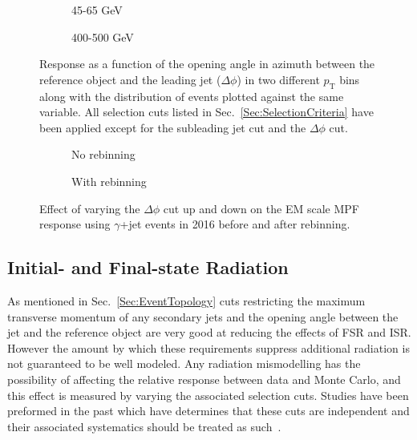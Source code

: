 \begin{figure}[!ht]
\centering
\begin{subfigure}{.5\textwidth}
\centering
{}
\caption{45-65 GeV}
\end{subfigure}%
\begin{subfigure}{.5\textwidth}
\centering
{}
\caption{400-500 GeV}
\end{subfigure}
\caption{Response as a function of the opening angle in azimuth between the reference object and the leading jet ($\Delta\phi$) in two different $p_{\mathrm T}$ bins along with the distribution of events plotted against the same variable.  All selection cuts listed in Sec.~\ref{Sec:SelectionCriteria} have been applied except for the subleading jet cut and the $\Delta\phi$ cut.  }
\label{Fig:RespVsdPhiGJetEM2016}
\end{figure}

\begin{figure}[!ht]
\centering
\begin{subfigure}{.5\textwidth}
\centering
{}
\caption{No rebinning}
\end{subfigure}%
\begin{subfigure}{.5\textwidth}  \centering
{}
\caption{With rebinning}
\end{subfigure}
\caption{Effect of varying the $\Delta\phi$ cut up and down on the EM scale MPF response using $\gamma$+jet events in 2016 before and after rebinning. }
\label{Fig:dPhiGJetEM2016}
\end{figure}

\subsection{Initial- and Final-state Radiation}
As mentioned in Sec.~\ref{Sec:EventTopology} cuts restricting the maximum transverse momentum of any secondary jets and the opening angle between the jet and the reference object are very good at reducing the effects of FSR and ISR.
However the amount by which these requirements suppress additional radiation is not guaranteed to be well modeled.
Any radiation mismodelling has the possibility of affecting the relative response between data and Monte Carlo, and this effect is measured by varying the associated selection cuts.  
Studies have been preformed in the past which have determines that these cuts are independent and their associated systematics should be treated as such~\cite{ATLAS-CONF-2011-031}.  

